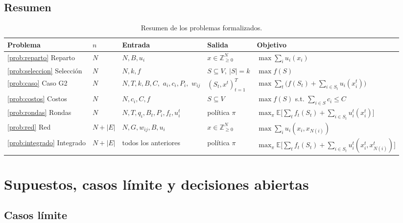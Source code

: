 \documentclass[11pt,a4paper]{article}
\theoremstyle{definition}
\theoremstyle{plain}
\newcommand{\Z}{\mathbb{Z}}
\begin{document}
\subsection{Resumen}

\begin{table}[htbp]
\centering
\small
\renewcommand{\arraystretch}{1.25}
\begin{tabularx}{\textwidth}{@{}p{2.6cm}p{1.7cm}X X X@{}}
\toprule
Problema & $n$ & Entrada & Salida & Objetivo \\
\midrule
\ref{prob:reparto} Reparto &
$N$ &
$N,B,u_i$ &
$x\in\Z_{\ge0}^N$ &
$\max\sum_i u_i(x_i)$ \\
\addlinespace
\ref{prob:seleccion} Selección &
$N$ &
$N,k,f$ &
$S\subseteq V,\ |S|=k$ &
$\max f(S)$ \\
\addlinespace
\ref{prob:caso} Caso G2 &
$N$ &
$N,T,k,B,C,$ $a_i,c_i,P_i,$ $w_{ij}$ &
$(S_t,x^t)_{t=1}^{T}$ &
$\max\sum_t\bigl(f(S_t)+\sum_{i\in S_t}u_i(x_i^t)\bigr)$ \\
\addlinespace
\ref{prob:costos} Costos &
$N$ &
$N,c_i,C,f$ &
$S\subseteq V$ &
$\max f(S)$ s.t. $\sum_{i\in S}c_i\le C$ \\
\addlinespace
\ref{prob:rondas} Rondas &
$N$ &
$N,T,q_i,B_t,P_i,f_t,u_i^t$ &
política $\pi$ &
$\max_\pi\mathbb{E}\bigl[\sum_t f_t(S_t)+\sum_{i\in S_t}u_i^t(x_i^t)\bigr]$ \\
\addlinespace
\ref{prob:red} Red &
$N+|E|$ &
$N,G,w_{ij},B,u_i$ &
$x\in\Z_{\ge0}^N$ &
$\max\sum_i u_i(x_i,x_{N(i)})$ \\
\addlinespace
\ref{prob:integrado} Integrado &
$N+|E|$ &
todos los anteriores &
política $\pi$ &
$\max_\pi\mathbb{E}\bigl[\sum_t f_t(S_t)+\sum_{i\in S_t}u_i^t(x_i^t,x_{N(i)}^t)\bigr]$ \\
\bottomrule
\end{tabularx}
\caption{Resumen de los problemas formalizados.}
\label{tab:resumen}
\end{table}

\section{Supuestos, casos límite y decisiones abiertas}

\subsection{Casos límite}
\end{document}

